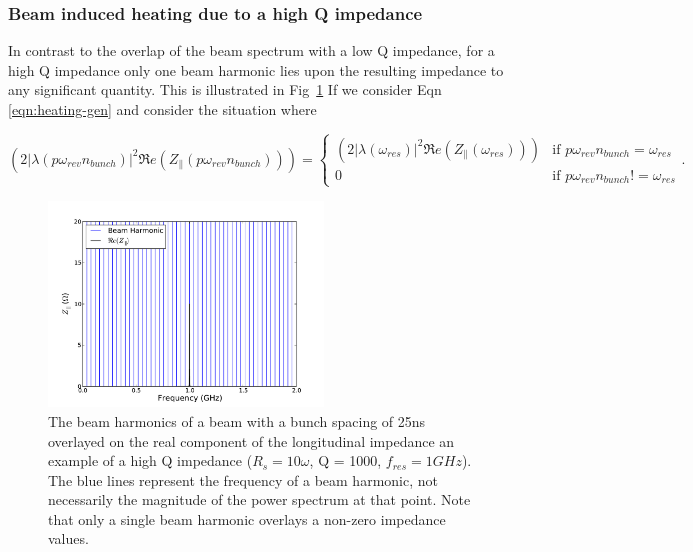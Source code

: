 \subsubsection{Beam induced heating due to a high Q impedance}

In contrast to the overlap of the beam spectrum with a low Q impedance, for a high Q impedance only one beam harmonic lies upon the resulting impedance to any significant quantity. This is illustrated in Fig~\ref{fig:high_q_harmonics} If we consider Eqn \ref{eqn:heating-gen} and consider the situation where

\begin{equation}
\left( 2 \left| \lambda \left(p \omega_{rev}n_{bunch} \right)  \right|^{2}  \Re{}e \left( Z_{\parallel} \left(p \omega_{rev}n_{bunch}\right) \right) \right) = 
\begin{cases}
\left( 2 \left| \lambda \left( \omega_{res} \right)  \right|^{2}  \Re{}e \left( Z_{\parallel} \left( \omega_{res} \right) \right) \right) &\textrm{if $p \omega_{rev} n_{bunch} = \omega_{res}$}\\
0								&\textrm{if $p \omega_{rev} n_{bunch} != \omega_{res}$}
\end{cases}
\label{eqn:single_harmonic_profile}.
\end{equation}

\begin{figure}
\begin{center}
\includegraphics[width=0.65\textwidth]{Wakefields_and_Impedances/figures/high_q_1000_resonance_beam_harmonics.pdf}
\end{center}
\caption{The beam harmonics of a beam with a bunch spacing of 25ns overlayed on the real component of the longitudinal impedance an example of a high Q impedance ($R_{s}=10\omega$, Q = 1000, $f_{res}=1GHz$). The blue lines represent the frequency of a beam harmonic, not necessarily the magnitude of the power spectrum at that point. Note that only a single beam harmonic overlays a non-zero impedance values.}
\label{fig:high_q_harmonics}
\end{figure}

